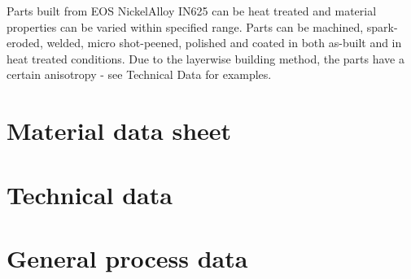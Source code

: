 \documentclass[10pt]{article}
\begin{document}
Parts built from EOS NickelAlloy IN625 can be heat treated and material properties can be varied within specified range. Parts can be machined, spark-eroded, welded, micro shot-peened, polished and coated in both as-built and in heat treated conditions. Due to the layerwise building method, the parts have a certain anisotropy - see Technical Data for examples.

\section*{Material data sheet}
\section*{Technical data}
\section*{General process data}
\end{document}
